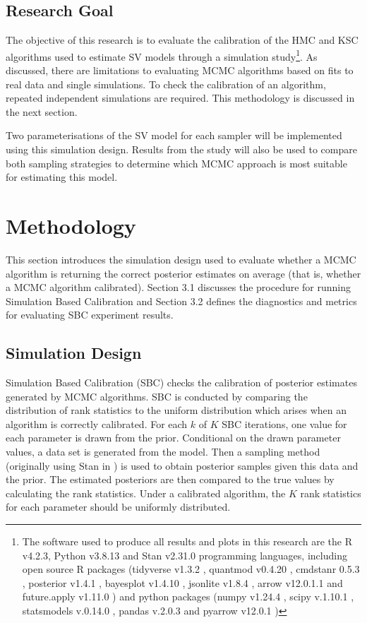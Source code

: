 \documentclass[12pt, a4paper]{article}
\begin{document}
\subsection{Research Goal}
    The objective of this research is to evaluate the calibration of the HMC and KSC algorithms used to estimate SV models through a simulation study\footnote{The software used to produce all results and plots in this research are the R v4.2.3\citep{rlang}, Python v3.8.13 \citep{10.5555/1593511} and Stan v2.31.0 \citep{stan} programming languages, including open source R packages (tidyverse v1.3.2 \citep{tidyverse}, quantmod v0.4.20 \citep{quantmod}, cmdstanr 0.5.3 \citep{cmdstanr}, posterior v1.4.1 \citep{posteriorr}, bayesplot v1.4.10 \citep{bayesplot}, jsonlite v1.8.4 \citep{jsonlite}, arrow v12.0.1.1 \citep{arrow} and future.apply v1.11.0 \citep{RJ-2021-048}) and python packages (numpy v1.24.4 \citep{harris2020array}, scipy v.1.10.1 \citep{2020SciPy-NMeth}, statsmodels v.0.14.0 \citep{seabold2010statsmodels}, pandas v.2.0.3 \citep{mckinney-proc-scipy-2010} and pyarrow v12.0.1 \citep{arrow})}. As discussed, there are limitations to evaluating MCMC algorithms based on fits to real data and single simulations. To check the calibration of an algorithm, repeated independent simulations are required. This methodology is discussed in the next section. 

    Two parameterisations of the SV model for each sampler will be implemented using this simulation design. Results from the study will also be used to compare both sampling strategies to determine which MCMC approach is most suitable for estimating this model. 

\section{Methodology}
This section introduces the simulation design used to evaluate whether a MCMC algorithm is returning the correct posterior estimates on average (that is, whether a MCMC algorithm calibrated). Section 3.1 discusses the procedure for running Simulation Based Calibration and Section 3.2 defines the diagnostics and metrics for evaluating SBC experiment results.

    \subsection{Simulation Design}
        Simulation Based Calibration (SBC) checks the calibration of posterior estimates generated by MCMC algorithms. SBC is conducted by comparing the distribution of rank statistics to the uniform distribution which arises when an algorithm is correctly calibrated. For each $k$ of $K$ SBC iterations, one value for each parameter is drawn from the prior. Conditional on the drawn parameter values, a data set is generated from the model. Then a sampling method (originally using Stan in \citet{talts2020validating}) is used to obtain posterior samples given this data and the prior. The estimated posteriors are then compared to the true values by calculating the rank statistics. Under a calibrated algorithm, the $K$ rank statistics for each parameter should be uniformly distributed. 
\end{document}
